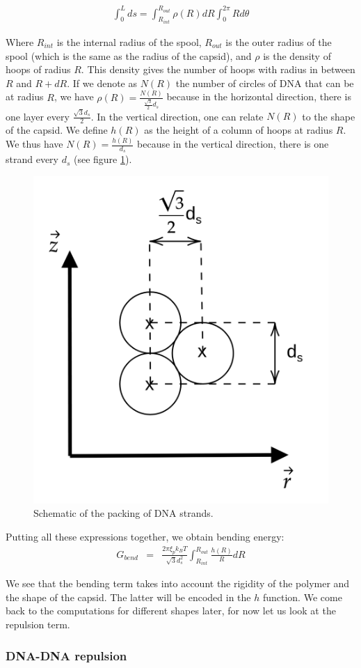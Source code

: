 \documentclass{article}
\begin{document}
\begin{eqnarray*}
    \int_{0}^{L} ds = \int_{R_{int}} ^{R_{out}} \rho (R) dR \int_0^{2\pi} R d \theta 
\end{eqnarray*}

Where $R_{int}$ is the internal radius of the spool, $R_{out}$ is the outer radius of the spool (which is the same as the radius of the capsid), and $\rho$ is the density of hoops of radius $R$. This density gives the number of hoops with radius in between $R$ and $R+ dR$. If we denote as $N(R)$ the number of circles of DNA that can be at radius $R$, we have $\rho (R) = \frac{N(R)}{\frac{\sqrt{3}}{2} d_s } $ because in the horizontal direction, there is one layer every $\frac{\sqrt{3} d_s}{2}$. In the vertical direction, one can relate $N(R)$ to the shape  of the capsid. We define $h(R)$ as the height of a column of hoops at radius $R$. We thus have $N(R) = \frac{h(R)}{d_s} $ because in the vertical direction, there is one strand every $d_s$ (see figure \ref{fig:hexagone}).

\begin{figure}[H]
    \centering
    \includegraphics[height=0.3\textwidth]{schema_packing.png}
    \caption{Schematic of the packing of DNA strands.}
    \label{fig:hexagone}
\end{figure}

Putting all these expressions together, we obtain bending energy:
\begin{eqnarray}
    G_{bend} &=& \frac{2 \pi \xi_p k_B T}{\sqrt{3} d_s^2} \int_{R_{int}}^{R_{out}} \frac{h(R)}{R} dR
\end{eqnarray}

We see that the bending term takes into account the rigidity of the polymer and the shape of the capsid. The latter will be encoded in the $h$ function. We come back to the computations for different shapes later, for now let us look at the repulsion term.

\subsubsection{DNA-DNA repulsion}
\end{document}
